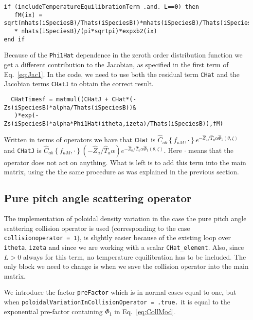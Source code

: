 \documentclass[12pt]{article}
\begin{document}
\begin{lstlisting}
if (includeTemperatureEquilibrationTerm .and. L==0) then
   fM(ix) = sqrt(mhats(iSpeciesB)/Thats(iSpeciesB))*mhats(iSpeciesB)/Thats(iSpeciesB)&
   * nhats(iSpeciesB)/(pi*sqrtpi)*expxb2(ix)
end if   
\end{lstlisting}

\noindent
Because of the \texttt{Phi1Hat} dependence in the zeroth order distribution function we get a different contribution to the Jacobian, as specified in the first term of Eq.~\eqref{eq:Jac1}. In the code, we need to use both the residual term \texttt{CHat} and the Jacobian terms \texttt{CHatJ} to obtain the correct result. 

\begin{lstlisting}
  CHatTimesf = matmul((CHatJ + CHat*(-Zs(iSpeciesB)*alpha/Thats(iSpeciesB))&
   )*exp(-Zs(iSpeciesB)*alpha*Phi1Hat(itheta,izeta)/Thats(iSpeciesB)),fM)
\end{lstlisting}

\noindent
Written in terms of operators we have that \texttt{CHat} is  $\hat C_{ab}\left\{f_{aM},\cdot\right\}e^{-\hat Z_a/\hat T_a \alpha\hat\Phi_1(\theta,\zeta)}$ and \texttt{CHatJ} is $\hat C_{ab}\left\{f_{aM},\cdot\right\}\left ( -\hat Z_a/\hat T_a \alpha \right ) e^{-\hat Z_a/\hat T_a \alpha\hat\Phi_1(\theta,\zeta)}$. Here $\cdot$ means that the operator does not act on anything. What is left is to add this term into the main matrix, using the the same procedure as was explained in the previous section.

\subsection*{Pure pitch angle scattering operator}
The implementation of poloidal density variation in the case the pure pitch angle scattering collision operator is used (corresponding to the case \texttt{collisionoperator = 1}), is slightly easier because of the existing loop over \texttt{itheta}, \texttt{izeta} and since we are working with a scalar \texttt{CHat\_element}. Also, since $L > 0$ always for this term, no temperature equilibration has to be included. The only block we need to change is when we save the collision operator into the main matrix. 

We introduce the factor \texttt{preFactor} which is in normal cases equal to one, but when \texttt{poloidalVariationInCollisionOperator = .true.} it is equal to the exponential pre-factor containing $\Phi_1$ in Eq.~\eqref{eq:CollMod}.
\end{document}

